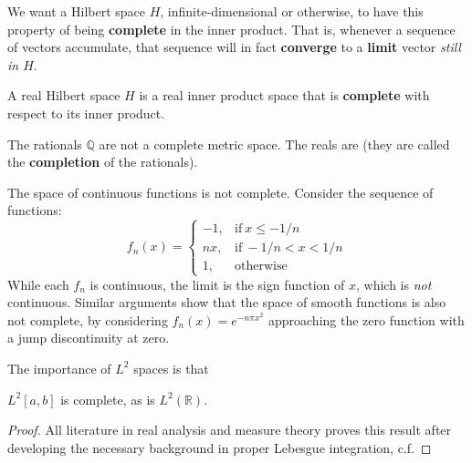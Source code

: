 	We want a Hilbert space $H$, infinite-dimensional or otherwise, to have this property of being \textbf{complete} in the inner product. That is, whenever a sequence of vectors accumulate, that sequence will in fact \textbf{converge} to a \textbf{limit} vector \emph{still in $H$}.
	
	\begin{defn}
		A real Hilbert space $H$ is a real inner product space that is \textbf{complete} with respect to its inner product. 
	\end{defn}
	\begin{example}
		The rationals $\mathbb Q$ are not a complete metric space. The reals are (they are called the \textbf{completion} of the rationals). 
	\end{example}
	\begin{example}
		The space of continuous functions is not complete. Consider the sequence of functions:
		\begin{equation}
			f_n(x) = \begin{cases}
    -1 ,& \mathrm{if} ~ x \leq  -1/n \\
    n x,  &\mathrm{if} ~ -1/n < x < 1/n \\
	1, & \mathrm{otherwise}
\end{cases}
		\end{equation}
		While each $f_n$ is continuous, the limit is the sign function of $x$, which is \emph{not} continuous. Similar arguments show that the space of smooth functions is also not complete, by considering $f_n (x) = e^{-n \pi x^2}$ approaching the zero function with a jump discontinuity at zero. 
	\end{example}
	
	
	The importance of $L^2$ spaces is that 
	\begin{theorem}
		$L^2[a,b]$ is complete, as is $L^2(\mathbb R)$.
	\end{theorem}
	\begin{proof}
		All literature in real analysis and measure theory proves this result after developing the necessary background in proper Lebesgue integration, c.f. 
	\end{proof}
	
